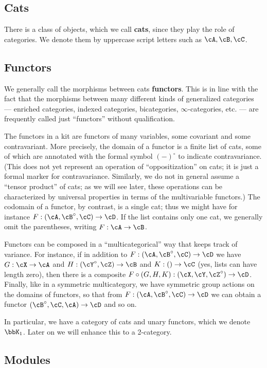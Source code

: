 \documentclass{amsart}
\newcommand{\A}{\cA}
\newcommand{\B}{\cB}
\newcommand{\C}{\cC}
\newcommand{\D}{\cD}
\newcommand{\X}{\cX}
\newcommand{\Y}{\cY}
\newcommand{\Z}{\cZ}
\newcommand{\K}{\bbK}
\renewcommand{\o}{^{\circ}}
\begin{document}
\subsection{Cats}

There is a class of objects, which we call \textbf{cats}, since they play the role of categories.
We denote them by uppercase script letters such as $\A,\B,\C$.

\subsection{Functors}

We generally call the morphisms between cats \textbf{functors}.
This is in line with the fact that the morphisms between many different kinds of generalized categories --- enriched categories, indexed categories, bicategories, $\infty$-categories, etc. --- are frequently called just ``functors'' without qualification.

The functors in a kit are functors of many variables, some covariant and some contravariant.
More precisely, the domain of a functor is a finite list of cats, some of which are annotated with the formal symbol $(-)\o$ to indicate contravariance.
(This does not yet represent an operation of ``oppositization'' on cats; it is just a formal marker for contravariance.
Similarly, we do not in general assume a ``tensor product'' of cats; as we will see later, these operations can be characterized by universal properties in terms of the multivariable functors.)
The codomain of a functor, by contrast, is a single cat; thus we might have for instance $F:(\A,\B\o,\C) \to \D$.
If the list contains only one cat, we generally omit the parentheses, writing $F:\A\to \B$.

Functors can be composed in a ``multicategorical'' way that keeps track of variance.
For instance, if in addition to $F:(\A,\B\o,\C) \to \D$ we have $G:\X \to \A$ and $H:(\Y\o,\Z)\to \B$ and $K:()\to \C$ (yes, lists can have length zero), then there is a composite $F\circ (G,H,K) : (\X,\Y,\Z\o)\to \D$.
Finally, like in a symmetric multicategory, we have symmetric group actions on the domains of functors, so that from $F:(\A,\B\o,\C) \to \D$ we can obtain a functor $(\B\o,\C,\A)\to \D$ and so on.

In particular, we have a category of cats and unary functors, which we denote $\K_1$.
Later on we will enhance this to a 2-category.

\subsection{Modules}
\end{document}
